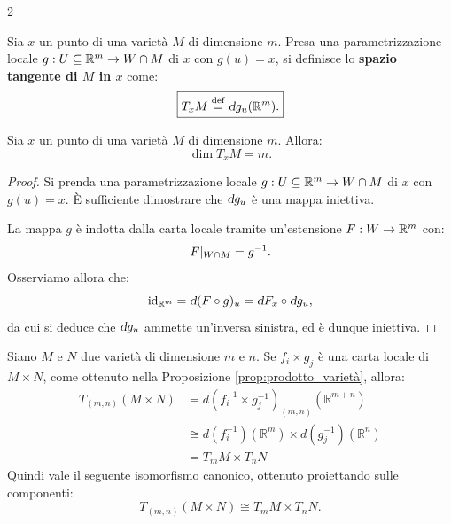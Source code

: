 \begin{multicols*}{2}
    \begin{definition}
        Sia $x$ un punto di una varietà $M$ di dimensione $m$. Presa una
        parametrizzazione locale $g : U \subseteq \mathbb{R}^m \to W \cap M$ di
        $x$ con $g(u) = x$, si definisce lo \textbf{spazio tangente di $M$ in $x$} come:
        \[
            \boxed{T_x M \defeq \dif g_u(\RR^m).}
        \]
    \end{definition}

    \begin{proposition}
        Sia $x$ un punto di una varietà $M$ di dimensione $m$. Allora:
        \[
            \boxed{\dim T_x M = m.}
        \]
    \end{proposition}

    \begin{proof}
        Si prenda una parametrizzazione locale
        $g : U \subseteq \mathbb{R}^m \to W \cap M$ di
        $x$ con $g(u) = x$. È sufficiente dimostrare
        che $\dif g_u$ è una mappa iniettiva. \smallskip

        La mappa $g$ è indotta dalla carta locale tramite
        un'estensione $F : W \to \mathbb{R}^m$ con:
        \[
            F\arrowvert_{W \cap M} = g^{-1}.
        \]
        Osserviamo allora che:
        \[
            \id_{\RR^m} = \dif (F \circ g)_u = \dif F_{x} \circ \dif g_u,
        \]
        da cui si deduce che $\dif g_u$ ammette un'inversa sinistra, ed è
        dunque iniettiva.
    \end{proof}

    \begin{remark} \label{rmk:tangente_prodotto}
        Siano $M$ e $N$ due varietà di dimensione $m$ e $n$.
        Se $f_i \times g_j$ è una carta locale di $M \times N$,
        come ottenuto nella Proposizione \ref{prop:prodotto_varietà}, allora:
        \begin{align*}
            T_{(m, n)}(M \times N) & = d(f_i^{-1} \times g_j^{-1})_{(m, n)}(\mathbb{R}^{m+n})         \\
                                   & \cong d(f_i^{-1})(\mathbb{R}^m) \times d(g_j^{-1})(\mathbb{R}^n) \\
                                   & = T_m M \times T_n N
        \end{align*}
        Quindi vale il seguente isomorfismo canonico, ottenuto proiettando sulle componenti:
        \[
            \boxed{T_{(m, n)} (M \times N) \cong T_m M \times T_n N.}
        \]
    \end{remark}


\end{multicols*}
